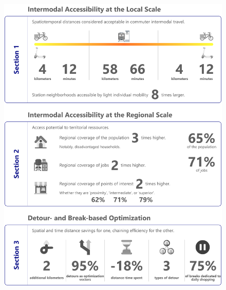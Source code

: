 \begin{refsegment}
\begin{figure}[h!]\vspace*{4pt}
        \caption*{}
        \label{graphical-abstract-chap2}
        \centerline{\includegraphics[width=1\columnwidth]{src/Figures/Graphical-abstract/EN_Graphical_abstract_chap5.pdf}}
        \vspace{5pt}
    \end{figure}


\end{refsegment}
